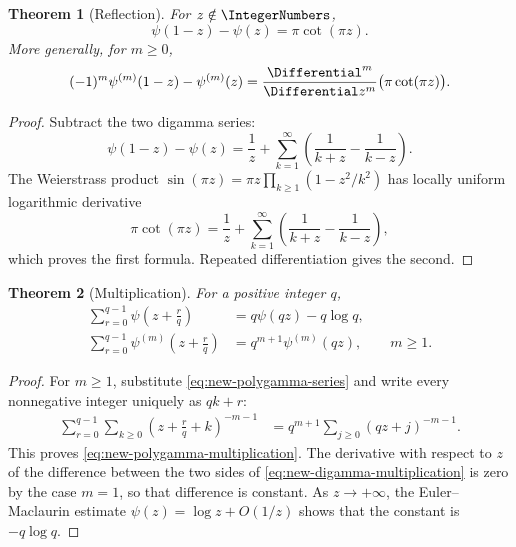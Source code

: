 \documentclass[11pt,a4paper,oneside,openany]{book}
\newtheorem{theorem}{Theorem}[chapter]
\theoremstyle{definition}
\theoremstyle{remark}
\begin{document}
\begin{theorem}[Reflection]\label{thm:new-digamma-reflection}
For $z\notin\IntegerNumbers$,
\begin{equation}\label{eq:new-digamma-reflection}
 \psi(1-z)-\psi(z)=\pi\cot(\pi z).
\end{equation}
More generally, for $m\ge0$,
\begin{equation}\label{eq:new-polygamma-reflection}
 (-1)^m\psi^{(m)}(1-z)-\psi^{(m)}(z)
 =\frac{\Differential^m}{\Differential z^m}\bigl(\pi\cot(\pi z)\bigr).
\end{equation}
\end{theorem}

\begin{proof}
Subtract the two digamma series:
\[
 \psi(1-z)-\psi(z)
 =\frac1z+\sum_{k=1}^{\infty}
 \left(\frac1{k+z}-\frac1{k-z}\right).
\]
The Weierstrass product
$\sin(\pi z)=\pi z\prod_{k\ge1}(1-z^2/k^2)$ has locally uniform logarithmic
derivative
\[
 \pi\cot(\pi z)=\frac1z+
 \sum_{k=1}^{\infty}\left(\frac1{k+z}-\frac1{k-z}\right),
\]
which proves the first formula.  Repeated differentiation gives the second.
\end{proof}

\begin{theorem}[Multiplication]\label{thm:new-polygamma-multiplication}
For a positive integer $q$,
\begin{align}
 \sum_{r=0}^{q-1}\psi\left(z+\frac rq\right)
 &=q\psi(qz)-q\log q,
 \label{eq:new-digamma-multiplication}\\
 \sum_{r=0}^{q-1}\psi^{(m)}\left(z+\frac rq\right)
 &=q^{m+1}\psi^{(m)}(qz),\qquad m\ge1.
 \label{eq:new-polygamma-multiplication}
\end{align}
\end{theorem}

\begin{proof}
For $m\ge1$, substitute \eqref{eq:new-polygamma-series} and write every
nonnegative integer uniquely as $qk+r$:
\begin{align*}
 \sum_{r=0}^{q-1}\sum_{k\ge0}
 \left(z+\frac rq+k\right)^{-m-1}
 &=q^{m+1}\sum_{j\ge0}(qz+j)^{-m-1}.
\end{align*}
This proves \eqref{eq:new-polygamma-multiplication}.  The derivative with
respect to $z$ of the difference between the two sides of
\eqref{eq:new-digamma-multiplication} is zero by the case $m=1$, so that
difference is constant.  As $z\to+\infty$, the Euler--Maclaurin estimate
$\psi(z)=\log z+O(1/z)$ shows that the constant is $-q\log q$.
\end{proof}
\end{document}
